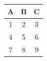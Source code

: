 \documentclass{article}
\begin{document}
\begin{table}[htbp]
\centering
{}
\begin{tabular}{ccc}
\toprule
A & B & C \\
\midrule
1 & 2 & 3 \\
4 & 5 & 6 \\
7 & 8 & 9 \\
\bottomrule
\end{tabular}
\end{table}
\end{document}
